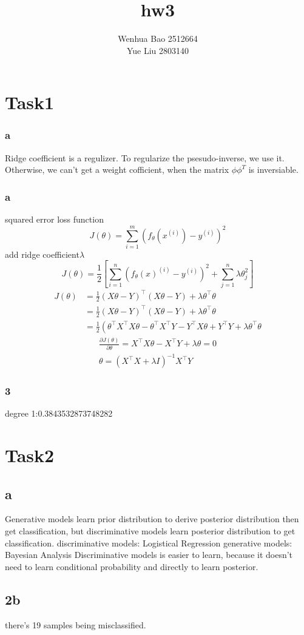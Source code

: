 \documentclass{article}
\title{hw3}
\author{Wenhua Bao 2512664\\Yue Liu 2803140}
\begin{document}
\maketitle
\section{Task1}
\subsubsection{a}
Ridge coefficient is a regulizer.
To regularize the psesudo-inverse, we use it. Otherwise, we can't get a weight cofficient, when the matrix $\phi\phi^T$ is inversiable.
\subsubsection{a}
squared error loss function
$$J(\theta)=\sum_{i=1}^{m}\left(f_{\theta}\left(x^{(i)}\right)-y^{(i)}\right)^{2}$$
add ridge coefficient$\lambda$
$$J(\theta)=\frac{1}{2}\left[\sum_{i=1}^{n}\left(f_{\theta}(x)^{(i)}-y^{(i)}\right)^{2}+\sum_{j=1}^{n} \lambda\theta_{j}^{2}\right]$$
$$\begin{aligned}
J(\theta) &=\frac{1}{2}(X \theta-Y)^{\top}(X \theta-Y)+\lambda \theta^{\top} \theta \\
&=\frac{1}{2}(X \theta-Y)^{\top}(X \theta-Y)+\lambda \theta^{\top} \theta \\
&=\frac{1}{2}\left(\theta^{\top} X^{\top} X \theta-\theta^{\top} X^{\top} Y-Y^{\top} X \theta+Y^{\top}Y+\lambda \theta^{\top} \theta\right.
\end{aligned}$$
$$\begin{array}{l}
\frac{\partial J(\theta)}{\partial \theta}=X^{\top} X \theta-X^{\top} Y+\lambda \theta=0 \\
\theta=\left(X^{\top} X+\lambda I\right)^{-1} X^{\top} Y
\end{array}$$
\subsubsection{3}
degree 1:0.3843532873748282

\section{Task2}
\subsection{a}
Generative models learn prior distribution to derive posterior distribution then get classification, but discriminative models learn posterior distribution to get classification.
discriminative models: Logistical Regression
generative models: Bayesian Analysis
Discriminative models is easier to learn, because it doesn't need to learn conditional probability and directly to learn posterior.
\subsection{2b}
there's 19 samples being misclassified.
\end{document}
